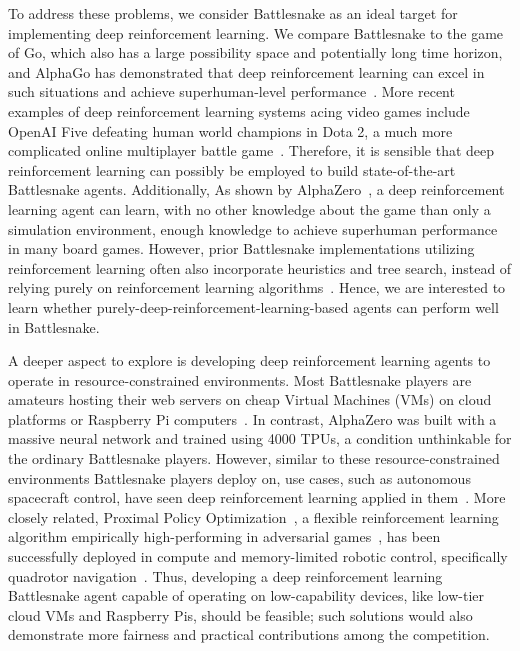 \documentclass[conference]{IEEEtran}
\begin{document}
To address these problems,
we consider Battlesnake as an ideal target for implementing deep reinforcement
learning. We compare Battlesnake to the game of Go,
which also has a large possibility space and potentially long time horizon,
and AlphaGo has demonstrated that deep reinforcement learning can excel in such
situations and achieve superhuman-level performance~\cite{silver2016mastering}.
More recent examples of deep reinforcement learning systems acing video games
include OpenAI Five defeating human world champions in Dota 2,
a much more complicated online multiplayer battle game~\cite{berner2019dota}.
Therefore,
it is sensible that deep reinforcement learning can possibly be employed to
build state-of-the-art Battlesnake agents. Additionally,
As shown by AlphaZero~\cite{silver2017mastering},
a deep reinforcement learning agent can learn,
with no other knowledge about the game than only a simulation environment,
enough knowledge to achieve superhuman performance in many board games. However,
prior Battlesnake implementations utilizing reinforcement learning often also
incorporate heuristics and tree search,
instead of relying purely on reinforcement learning
algorithms~\cite{chung2020battlesnake,binnersley2020battlesnake}. Hence,
we are interested to learn whether purely-deep-reinforcement-learning-based
agents can perform well in Battlesnake.

A deeper aspect to explore is developing deep reinforcement learning agents to
operate in resource-constrained environments.
Most Battlesnake players are amateurs hosting their web servers on cheap Virtual
Machines (VMs)
on cloud platforms or Raspberry Pi computers~\cite{standard_leaderboard}.
In contrast,
AlphaZero was built with a massive neural network and trained using 4000 TPUs,
a condition unthinkable for the ordinary Battlesnake players. However,
similar to these resource-constrained environments Battlesnake players deploy
on, use cases, such as autonomous spacecraft control,
have seen deep reinforcement learning applied in
them~\cite{harris2022generation}. More closely related,
Proximal Policy Optimization~\cite{schulman2017proximal},
a flexible reinforcement learning algorithm empirically high-performing in
adversarial
games~\cite{berner2019dota,binnersley2020battlesnake,chung2020battlesnake},
has been successfully deployed in compute and memory-limited robotic control,
specifically quadrotor navigation~\cite{huang2023collision,hegde2023hyperppo}.
Thus,
developing a deep reinforcement learning Battlesnake agent capable of operating
on low-capability devices, like low-tier cloud VMs and Raspberry Pis,
should be feasible;
such solutions would also demonstrate more fairness and practical contributions
among the competition.
\end{document}
